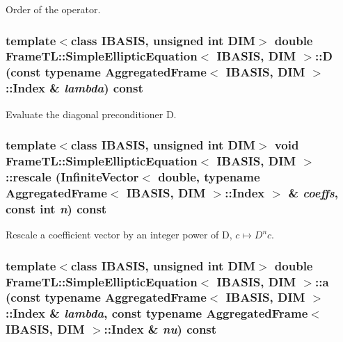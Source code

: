 Order of the operator. \hypertarget{classFrameTL_1_1SimpleEllipticEquation_7fa64961d69cccd58143f6908eccb8b4}{
\subsubsection[D]{\setlength{\rightskip}{0pt plus 5cm}template$<$class IBASIS, unsigned int DIM$>$ double {\bf FrameTL::SimpleEllipticEquation}$<$ IBASIS, DIM $>$::D (const typename {\bf AggregatedFrame}$<$ IBASIS, DIM $>$::{\bf Index} \& {\em lambda}) const}}
\label{classFrameTL_1_1SimpleEllipticEquation_7fa64961d69cccd58143f6908eccb8b4}


Evaluate the diagonal preconditioner D. \hypertarget{classFrameTL_1_1SimpleEllipticEquation_df7e344f9567c74f5c6e34c3b6942937}{
\subsubsection[rescale]{\setlength{\rightskip}{0pt plus 5cm}template$<$class IBASIS, unsigned int DIM$>$ void {\bf FrameTL::SimpleEllipticEquation}$<$ IBASIS, DIM $>$::rescale (InfiniteVector$<$ double, typename {\bf AggregatedFrame}$<$ IBASIS, DIM $>$::{\bf Index} $>$ \& {\em coeffs}, \/  const int {\em n}) const}}
\label{classFrameTL_1_1SimpleEllipticEquation_df7e344f9567c74f5c6e34c3b6942937}


Rescale a coefficient vector by an integer power of D, $c \mapsto D^{n}c$. \hypertarget{classFrameTL_1_1SimpleEllipticEquation_472d73dad42588a253df3c51a8ed08c4}{
\subsubsection[a]{\setlength{\rightskip}{0pt plus 5cm}template$<$class IBASIS, unsigned int DIM$>$ double {\bf FrameTL::SimpleEllipticEquation}$<$ IBASIS, DIM $>$::a (const typename {\bf AggregatedFrame}$<$ IBASIS, DIM $>$::{\bf Index} \& {\em lambda}, \/  const typename {\bf AggregatedFrame}$<$ IBASIS, DIM $>$::{\bf Index} \& {\em nu}) const}}
\label{classFrameTL_1_1SimpleEllipticEquation_472d73dad42588a253df3c51a8ed08c4}


